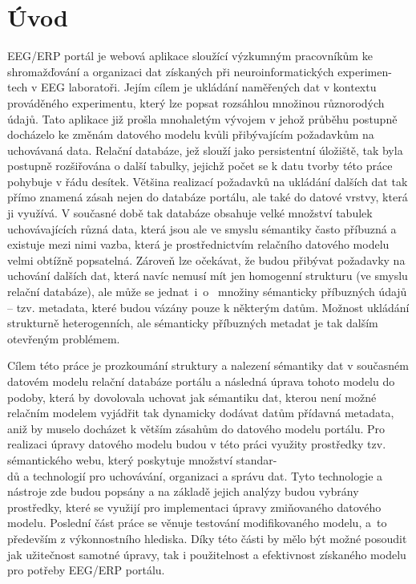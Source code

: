 \documentclass{projekt}
\begin{document}
\chapter{Úvod}
\hspace{0.65cm}EEG/ERP portál je webová aplikace sloužící výzkumným pracovníkům ke shromažďování a organizaci dat získaných při neuroinformatických experimen-\\tech v EEG laboratoři. Jejím cílem je ukládání naměřených dat v kontextu prováděného experimentu, který lze popsat rozsáhlou množinou různorodých údajů. Tato aplikace již prošla mnohaletým vývojem v jehož průběhu postupně docházelo ke změnám datového modelu kvůli přibývajícím požadavkům na uchovávaná data. Relační databáze, jež slouží jako persistentní úložiště, tak byla postupně rozšiřována o další tabulky, jejichž počet se k datu tvorby této práce pohybuje v řádu desítek. Většina realizací požadavků na ukládání dalších dat tak přímo znamená zásah nejen do databáze portálu, ale také do datové vrstvy, která ji využívá. V současné době tak databáze obsahuje velké množství tabulek uchovávajících různá data, která jsou ale ve smyslu sémantiky často příbuzná a existuje mezi nimi vazba, která je prostřednictvím relačního datového modelu velmi obtížně popsatelná. Zároveň lze očekávat, že budou přibývat požadavky na uchování dalších dat, která navíc nemusí mít jen homogenní strukturu (ve smyslu relační databáze), ale může se jednat~i~o~ množiny sémanticky příbuzných údajů – tzv. metadata, které budou vázány pouze k některým datům. Možnost ukládání strukturně heterogenních, ale sémanticky příbuzných metadat je tak dalším otevřeným problémem.

Cílem této práce je prozkoumání struktury a nalezení sémantiky dat v současném datovém modelu relační databáze portálu a následná úprava tohoto modelu do podoby, která by dovolovala uchovat jak sémantiku dat, kterou není možné relačním modelem vyjádřit tak dynamicky dodávat datům přídavná metadata, aniž by muselo docházet k větším zásahům do datového modelu portálu. Pro realizaci úpravy datového modelu budou v této práci využity prostředky tzv. sémantického webu, který poskytuje množství standar-\\dů a technologií pro uchovávání, organizaci a správu dat. Tyto technologie a nástroje zde budou popsány a na základě jejich analýzy budou vybrány prostředky, které se využijí pro implementaci úpravy zmiňovaného datového modelu. 
Poslední část práce se věnuje testování modifikovaného modelu, a~to především z výkonnostního hlediska. Díky této části by mělo být možné posoudit jak užitečnost samotné úpravy, tak i použitelnost a efektivnost získaného modelu pro potřeby EEG/ERP portálu.
\end{document}
